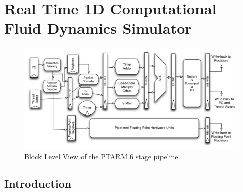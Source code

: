 \section{Real Time 1D Computational Fluid Dynamics Simulator}
\label{sec:1dCFD}


\begin{figure}
  \vspace{-20pt}
  \begin{center}
    \includegraphics[scale=.6]{figs/ptarm_pipeline_six_stage}
  \end{center}
  \vspace{-20pt}
  \caption{Block Level View of the PTARM 6 stage pipeline}
  \label{fig:ptarm_pipeline_six_stage}
\end{figure}


\subsection{Introduction}


